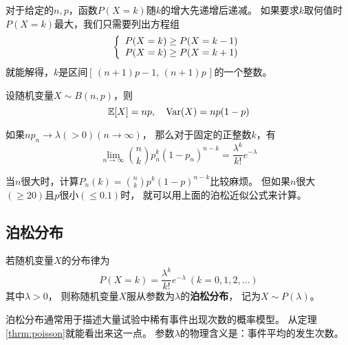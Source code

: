 \begin{remark}
  对于给定的$n,p$，函数$P(X=k)$随$k$的增大先递增后递减。
  如果要求$k$取何值时$P(X=k)$最大，我们只需要列出方程组
  \begin{displaymath}
    \meqs{c}{
    P(X=k) \ge P(X=k-1) \\
    P(X=k) \ge P(X=k+1)}
  \end{displaymath}
  就能解得，$k$是区间$[\,(n+1)p-1,\,(n+1)p\,]$的一个整数。
\end{remark}

\begin{theorem}[二项分布的数字特征]
  设随机变量$X\sim B(n,p)$，则
  \begin{displaymath}
    \mexpect[X] = np,\quad \mvar(X) = np(1-p)
  \end{displaymath}
\end{theorem}

\begin{theorem}[泊松定理] \label{thrm:poisson}
  如果$np_n\to\lambda(>0) (n\to\infty)$，
  那么对于固定的正整数$k$，有
  \begin{displaymath}
    \lim_{n\to\infty} \binom{n}{k}p_n^k(1-p_n)^{n-k} =
      \frac{\lambda^k}{k!}e^{-\lambda}
  \end{displaymath}
\end{theorem}

\begin{remark}
  当$n$很大时，计算$P_n(k)=\binom{n}{k}p^k(1-p)^{n-k}$比较麻烦。
  但如果$n$很大$(\ge 20)$且$p$很小$(\le 0.1)$时，
  就可以用上面的泊松近似公式来计算。
\end{remark}

\subsection{泊松分布}
\begin{definition}[泊松分布]
  若随机变量$X$的分布律为
  \begin{displaymath}
    P(X=k)=\frac{\lambda^k}{k!}e^{-\lambda}\ (k=0,1,2,\dots)
  \end{displaymath}
  其中$\lambda > 0$，
  则称随机变量$X$服从参数为$\lambda$的\textbf{泊松分布}，
  记为$X\sim P(\lambda)$。
\end{definition}

\begin{remark}
  泊松分布通常用于描述大量试验中稀有事件出现次数的概率模型。
  从定理\ref{thrm:poisson}就能看出来这一点。
  参数$\lambda$的物理含义是：事件平均的发生次数。
\end{remark}

